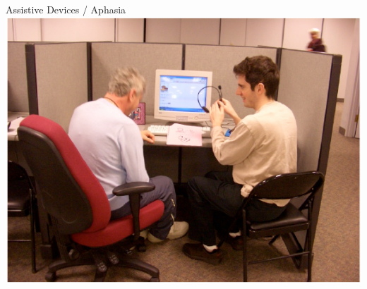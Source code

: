 \documentclass[compress]{beamer}
\begin{document}
{\begin{columns}
    \begin{block}{Assistive Devices / Aphasia}
     \centering
        \includegraphics[width=0.4\linewidth]{evocation/figures/jordan_at_adler} \\
       \cite{boyd-graber-06b,ma-09,nikolova-09}
    \end{block}

\end{columns}

}
\end{document}
